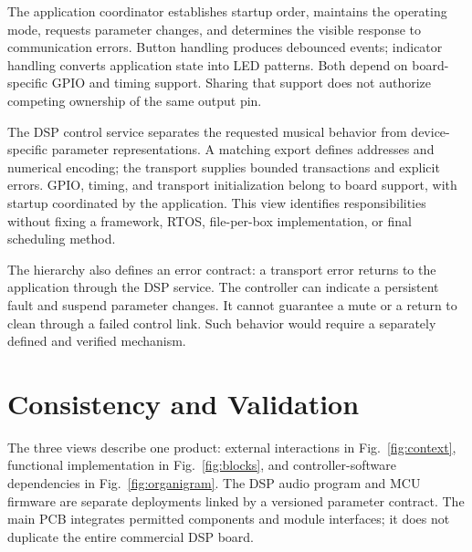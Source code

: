 \documentclass[conference]{IEEEtran}
\begin{document}
The application coordinator establishes startup order, maintains the
operating mode, requests parameter changes, and determines the visible
response to communication errors. Button handling produces debounced
events; indicator handling converts application state into LED patterns.
Both depend on board-specific GPIO and timing support. Sharing that support
does not authorize competing ownership of the same output pin.

The DSP control service separates the requested musical behavior from
device-specific parameter representations. A matching export defines
addresses and numerical encoding; the transport supplies bounded
transactions and explicit errors. GPIO, timing, and transport initialization
belong to board support, with startup coordinated by the application.
This view identifies responsibilities without fixing a framework, RTOS,
file-per-box implementation, or final scheduling method.

The hierarchy also defines an error contract: a transport error returns to
the application through the DSP service. The controller can indicate a
persistent fault and suspend parameter changes. It cannot guarantee a mute
or a return to clean through a failed control link. Such behavior would
require a separately defined and verified mechanism.

\section{Consistency and Validation}

The three views describe one product: external interactions in
Fig.~\ref{fig:context}, functional implementation in Fig.~\ref{fig:blocks},
and controller-software dependencies in Fig.~\ref{fig:organigram}. The DSP
audio program and MCU firmware are separate deployments linked by a
versioned parameter contract. The main PCB integrates permitted components
and module interfaces; it does not duplicate the entire commercial DSP
board.
\end{document}
